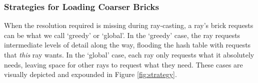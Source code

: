 
%

\subsubsection{Strategies for Loading Coarser Bricks}

When the resolution required is missing during ray-casting, a ray's
brick requests can be what we call `greedy' or `global'.  In the
`greedy' case, the ray requests intermediate levels of detail along the
way, flooding the hash table with
requests that \textit{this} ray wants.  In the `global' case, each
ray only requests what it absolutely needs, leaving space for other
rays to request what they need.  These cases are visually depicted and
expounded in Figure
\ref{fig:strategy}.



